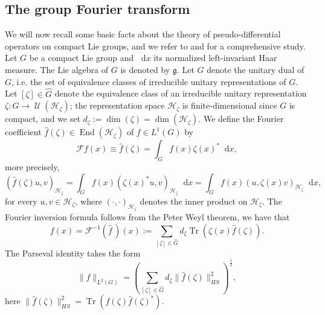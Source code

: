 \documentclass[12pt, reqno]{amsart}
\theoremstyle{definition}
\theoremstyle{remark}
\numberwithin{equation}{section}
\newcommand*\diff{\mathop{}\!\mathrm{d}}
\begin{document}
\subsection{The group Fourier transform}
We will now recall some basic facts about the theory of pseudo-differential operators on compact Lie groups, and we refer to \cite{17} and \cite{18} for a comprehensive study. Let $G$ be a compact Lie group and $\diff{x}$ its normalized left-invariant Haar measure. The Lie algebra of $G$ is denoted by $\mathfrak{g}$. Let $\widehat{G}$ denote the unitary dual of $G$, i.e. the set of equivalence classes of irreducible unitary representations of $G$. Let $[\zeta]\in\widehat{G}$ denote the equivalence class of an irreducible unitary representation $\zeta\colon G\to\operatorname{\mathcal{U}}(\mathcal{H}_\zeta)$; the representation space $\mathcal{H}_\zeta$ is finite-dimensional since $G$ is compact, and we set $d_\zeta:=\operatorname{dim}(\zeta)=\operatorname{dim}(\mathcal{H}_\zeta)$. We define the Fourier coefficient $\widehat{f}(\zeta)\in\operatorname{End}(\mathcal{H}_\zeta)$ of $f\in L^1(G)$ by
\begin{equation*}
      \mathscr{F}f(x)\equiv  \widehat{f}(\zeta)=\int_{G}f(x)\zeta(x)^*\diff{x},
    \end{equation*}
    more precisely, 
    \begin{equation*}
        (\widehat{f}(\zeta)u,v)_{\mathcal{H}_\zeta}=\int_{G}f(x)(\zeta(x)^*u,v)_{\mathcal{H}_\zeta}\diff{x}=\int_{G}f(x)(u,\zeta(x)v)_{\mathcal{H}_\zeta}\diff{x},
    \end{equation*}
    for every $u,v\in\mathcal{H}_{\zeta}$, where $(\cdot,\cdot)_{\mathcal{H}_{\zeta}}$ denotes the inner product on $\mathcal{H}_{\zeta}$.
The Fourier inversion formula follows from the Peter Weyl theorem, we have that
\begin{equation*}
    f(x)=\mathscr{F}^{-1}(\widehat{f}\,)(x):=\sum_{[\zeta]\in\widehat{G}}d_\zeta\operatorname{Tr}(\zeta(x)\widehat{f}(\zeta)).
\end{equation*}
The Parseval identity takes the form
\begin{equation*}
    \|f\|_{L^2(G)}=\left(\sum_{[\zeta]\in\widehat{G}}d_\zeta\|\widehat{f}(\zeta)\|_{HS}^2\right)^{\frac{1}{2}},
\end{equation*}
here $\|\widehat{f}(\zeta)\|_{HS}^2=\operatorname{Tr}(\widehat{f}(\zeta)\widehat{f}(\zeta)^*)$. 
\end{document}
